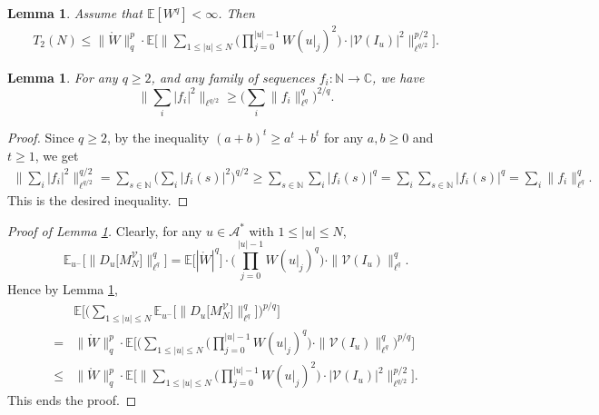 \documentclass[12pt]{amsart}
\newtheorem{lemma}[theorem]{Lemma}
\theoremstyle{definition}
\theoremstyle{remark}
\newcommand{\N}{\mathbb{N}}
\newcommand{\C}{\mathbb{C}}
\newcommand{\E}{\mathbb{E}}
\newcommand{\Ab}{\mathcal{A}}
\numberwithin{equation}{section}
\begin{document}
\begin{lemma}\label{lem-II-le-I}
Assume that $
\E[W^q]<\infty$. Then 
\begin{align*}
T_2(N) \le   \|\mathring{W}\|_q^p   
 \cdot   \E\Big[ \Big\| \sum_{1\le |u|\le N}    \Big(  \prod_{j=0}^{|u|-1} W(u|_j)^2 \Big)   \cdot  \big| \mathcal{V}(I_u)  \big|^2       \Big\|_{\ell^{q/2}}^{p/2} \Big].
\end{align*}
\end{lemma}



\begin{lemma}\label{lem-convex}
For any $q\ge 2$, and any family of sequences $f_i: \N\rightarrow \C$, we have 
\[
\Big\| \sum_{i} |f_i|^2 \Big\|_{\ell^{q/2}} \ge    \Big(\sum_i \| f_i\|_{\ell^q}^q\Big)^{2/q}. 
\]
\end{lemma}
\begin{proof}
Since $q\ge 2$,  by the   inequality $(a+b)^t \ge a^t + b^t$ for  any $a, b \ge 0$ and $t \ge 1$, we get 
\begin{align*}
\Big\| \sum_{i} |f_i|^2 \Big\|_{\ell^{q/2}}^{q/2}   = \sum_{s\in \N} \Big(\sum_{i}  |f_i(s) |^2\Big)^{q/2} \ge \sum_{s\in \N} \sum_{i}  |f_i(s) |^q  =  \sum_{i}   \sum_{s\in \N} |f_i(s) |^q   =  \sum_i \| f_i\|_{\ell^q}^q. 
\end{align*} 
This is the desired inequality. 
\end{proof}

\begin{proof}[Proof of Lemma \ref{lem-II-le-I}]
Clearly,  for any $u\in \Ab^*$ with $1\le |u|\le N$, 
\[
\E_{u^{-}}\Big[\big\|  D_u \big[ M_N^\mathcal{V}\big] \big \|_{\ell^q}^q\Big]  =   \E\big[ |\mathring{W}|^q \big] \cdot  \Big(  \prod_{j=0}^{|u|-1} W(u|_j)^q \Big)   \cdot  \|\mathcal{V}(I_u)\|_{\ell^q}^q .
\]
Hence by Lemma \ref{lem-convex}, 
\begin{align*}
& \E\Big[\Big(\sum_{1\le |u|\le N}\E_{u^{-}}\big[\big\|  D_u \big[ M_N^\mathcal{V}\big] \big \|_{\ell^q}^q\big]\Big)^{p/q}\Big]
\\
= &    \|\mathring{W}\|_q^p   \cdot   \E\Big[\Big(\sum_{1\le |u|\le N}      \Big(  \prod_{j=0}^{|u|-1} W(u|_j)^q \Big)   \cdot  \|\mathcal{V}(I_u)\|_{\ell^q}^q   \Big)^{p/q}\Big] 
\\
\le & \|\mathring{W}\|_q^p   \cdot   \E\Big[ \Big\| \sum_{1\le |u|\le N}    \Big(  \prod_{j=0}^{|u|-1} W(u|_j)^2 \Big)   \cdot  \big| \mathcal{V}(I_u)  \big|^2       \Big\|_{\ell^{q/2}}^{p/2} \Big].
\end{align*}
This ends the proof. 
\end{proof}
\end{document}
